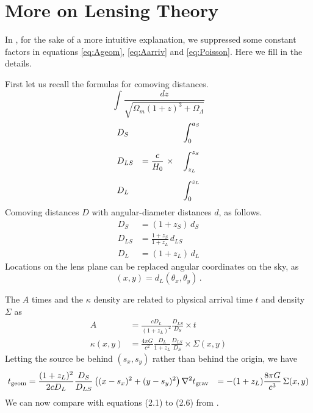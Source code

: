\appendix

\section{More on Lensing Theory} \label{sec:more-theory}

In , for the sake of a more intuitive
explanation, we suppressed some constant factors in
equations \eqref{eq:Ageom}, \eqref{eq:Aarriv} and \eqref{eq:Poisson}.
Here we fill in the details.

First let us recall the formulas for comoving distances.
\begin{equation}
\int \frac{dz}{\sqrt{\Omega_m(1+z)^3 + \Omega_\Lambda}}
\end{equation}
\begin{equation}
\begin{aligned}
&D_S    &                                &\int_0^{a_S} \\
\noalign{\medskip}
&D_{LS} & = \frac c{H_0} \ \times \quad  &\int_{z_L}^{z_S} \\
\noalign{\medskip}
&D_L    &                                &\int_0^{z_L}
\end{aligned}
\end{equation}
Comoving distances $D$ with angular-diameter distances $d$, as follows.
\begin{equation}
\begin{aligned}
D_S &= (1+z_S) \, d_S \\
D_{LS} &= \frac{1+z_S}{1+z_L} \, d_{LS} \\
D_L &= (1+z_L) \, d_L
\end{aligned}
\end{equation}
Locations on the lens plane can be replaced angular coordinates on the
sky, as
\begin{equation}
(x,y) = d_L (\theta_x,\theta_y) \,.
\end{equation}

The $A$ times and the $\kappa$ density are related to physical arrival
time $t$ and density $\Sigma$ as
\begin{equation}
\begin{aligned}
A           &= \frac{cD_L}{(1+z_L)^2} \frac{D_{LS}}{D_S} \times t \\
\kappa(x,y) &= \frac{4\pi G}{c^2} \frac{D_L}{1+z_L} \frac{D_{LS}}{D_S}
               \times \Sigma(x,y)
\end{aligned}
\end{equation}
Letting the source be behind $(s_x,s_y)$ rather than behind the
origin, we have
\begin{equation}
\begin{aligned}
t_{\rm geom} &= \frac{(1+z_L)^2}{2cD_L} \frac{D_S}{D_{LS}}
\left( (x-s_x)^2 + (y-s_y)^2 \right)
\nabla^2 t_{\rm grav} &= -(1+z_L)\frac{8\pi G}{c^3} \, \Sigma(x,y)
\end{aligned}
\end{equation}
We can now compare with equations (2.1) to (2.6)
from \cite{1986ApJ...310..568B}.

